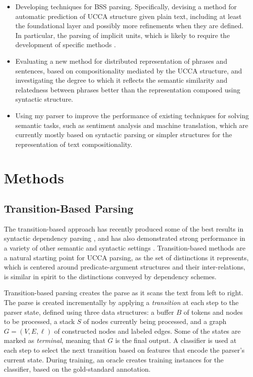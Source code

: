 \documentclass[11pt]{article}
\begin{document}
\begin{itemize}
  \item Developing techniques for BSS parsing.
    Specifically, devising a method for automatic prediction of UCCA
    structure given plain text, including at least the foundational layer and possibly more
    refinements when they are defined.
    In particular, the parsing of implicit units, which is likely to require
    the development of specific methods \cite{roth2015inducing}.
  \item Evaluating a new method for distributed representation of phrases
    and sentences, based on compositionality mediated by the UCCA structure,
    and investigating the degree to which it reflects the semantic similarity and relatedness
    between phrases better than the representation composed using syntactic structure.
  \item Using my parser to improve the performance of
    existing techniques for solving semantic tasks, such as sentiment analysis
    and machine translation, which are currently mostly based on syntactic
    parsing or simpler structures for the representation of text
    compositionality.
\end{itemize}


\section{Methods}\label{sec:methods}

\subsection{Transition-Based Parsing}\label{sec:transition_based}

The transition-based approach has recently produced some of the best
results in syntactic dependency parsing
\cite{dyer2015transition,ballesteros2015improved}, and has also demonstrated
strong performance in a variety of other semantic and syntactic settings
\cite[among others]{maier2015discontinuous,wang2015transition}.
Transition-based methods are a natural starting point for UCCA parsing,
as the set of distinctions it represents, which is centered around predicate-argument
structures and their inter-relations, is similar in spirit to the distinctions
conveyed by dependency schemes.

Transition-based parsing \cite{Nivre03anefficient} creates the parse
as it scans the text from left to right.
The parse is created incrementally by applying a \textit{transition} at each step to the parser state,
defined using three data structures: a buffer $B$ of tokens and nodes to be processed,
a stack $S$ of nodes currently being processed,
and a graph $G=(V,E,\ell)$ of constructed nodes and labeled edges.
Some of the states are marked as \textit{terminal}, meaning that $G$ is the final output.
A classifier is used at each step to select the next transition based on features
that encode the parser's current state.
During training, an oracle creates training instances for the classifier,
based on the gold-standard annotation.
\end{document}
